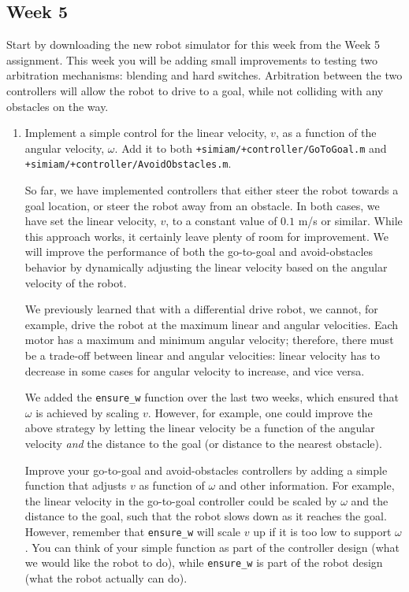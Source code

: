 \documentclass[10pt]{article}
\begin{document}
\newpage
\subsection{Week 5}
Start by downloading the new robot simulator for this week from the Week 5 assignment. This week you will be adding small improvements to  testing two arbitration mechanisms: blending and hard switches. Arbitration between the two controllers will allow the robot to drive to a goal, while not colliding with any obstacles on the way.

\begin{enumerate}
  \item Implement a simple control for the linear velocity, $v$, as a function of the angular velocity, $\omega$. Add it to both \texttt{+simiam/+controller/GoToGoal.m} and \texttt{+simiam/+controller/AvoidObstacles.m}.
  
  So far, we have implemented controllers that either steer the robot towards a goal location, or steer the robot away from an obstacle. In both cases, we have set the linear velocity, $v$, to a constant value of $0.1$ m/s or similar. While this approach works, it certainly leave plenty of room for improvement. We will improve the performance of both the go-to-goal and avoid-obstacles behavior by dynamically adjusting the linear velocity based on the angular velocity of the robot.
  
We previously learned that with a differential drive robot, we cannot, for example, drive the robot at the maximum linear and angular velocities. Each motor has a maximum and minimum angular velocity; therefore, there must be a trade-off between linear and angular velocities: linear velocity has to decrease in some cases for angular velocity to increase, and vice versa.
  
  We added the \texttt{ensure\_w} function over the last two weeks, which ensured that $\omega$ is achieved by scaling $v$. However, for example, one could improve the above strategy by letting the linear velocity be a function of the angular velocity \textit{and} the distance to the goal (or distance to the nearest obstacle).
  
  Improve your go-to-goal and avoid-obstacles controllers by adding a simple function that adjusts $v$ as function of $\omega$ and other information. For example, the linear velocity in the go-to-goal controller could be scaled by $\omega$ and the distance to the goal, such that the robot slows down as it reaches the goal. However, remember that \texttt{ensure\_w} will scale $v$ up if it is too low to support $\omega$. You can think of your simple function as part of the controller design (what we would like the robot to do), while \texttt{ensure\_w} is part of the robot design (what the robot actually can do). 
  

\end{enumerate}
\end{document}
